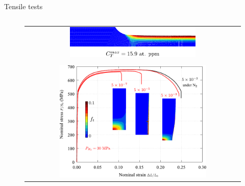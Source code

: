 \documentclass[9pt]{beamer}
\begin{document}
\begin{frame}{Tensile tests}
\begin{columns}
    
        \begin{column}{0.55\textwidth}
            \begin{figure}
                \begin{tabular}{c}
                    \includegraphics[width=0.6\textwidth]{Images/calcul_pl.pdf}\\
                    \\
                    \includegraphics[width=0.7\textwidth]{Images/fig_ST_sim_edt.pdf}\\
                \end{tabular}
            \end{figure} 
        \end{column}
    
    \end{columns}
    
\end{frame}

\end{document}
